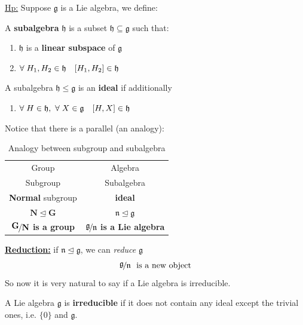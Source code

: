 \documentclass[../main.tex]{subfiles}
\begin{document}
\underline{Hp:} Suppose $\mathfrak{g}$ is a Lie algebra, we define:
\begin{definition} A \textbf{subalgebra} $\mathfrak{h}$ is a subset $\mathfrak{h}\subseteq\mathfrak{g}$ such that:
\renewcommand{\labelenumi}{\Roman{enumi})}
\begin{enumerate}
    \item $\mathfrak{h}$ is a \textbf{linear subspace} of $\mathfrak{g}$
    \item $\forall\;H_1,H_2\in\mathfrak{h}\quad \comm{H_1}{H_2}\in\mathfrak{h}$ 
\end{enumerate}
A subalgebra $\mathfrak{h}\leq\mathfrak{g}$ is an \textbf{ideal} if additionally
\renewcommand{\labelenumi}{III)}
\begin{enumerate}
    \item $\forall\;H\in\mathfrak{h}, \ \forall\;X\in\mathfrak{g}\quad \comm{H}{X}\in\mathfrak{h}$
\end{enumerate}
\end{definition}
Notice that there is a parallel (an analogy):
\begin{table}[H]
    \centering
    \begin{tabular}{c|c}
        Group & Algebra\\
        Subgroup & Subalgebra\\ 
        \textbf{Normal} subgroup & \textbf{ideal}\\
        $\mathbf{N}\trianglelefteq\mathbf{G}$ & $\mathfrak{n}\trianglelefteq\mathfrak{g}$ \\
        \( \nicefrac{\displaystyle\mathbf{G}}{\displaystyle\mathbf{N}}\) \textbf{is a group} & \(\nicefrac{\displaystyle\mathfrak{g}}{\displaystyle\mathfrak{n}}\) \textbf{is a Lie algebra}
        \end{tabular}
    \caption{Analogy between subgroup and subalgebra}
    \label{tab:analogy}
\end{table}
\underline{\textbf{Reduction:}} if $\mathfrak{n}\trianglelefteq\mathfrak{g}$, we can \textit{reduce} $\mathfrak{g}$
\[
\nicefrac{\displaystyle\mathfrak{g}}{\displaystyle\mathfrak{n}}\ \textrm{ is a new object}
\]
So now it is very natural to say if a Lie algebra is irreducible.
\begin{definition}A Lie algebra $\mathfrak{g}$ is \textbf{irreducible} if it does not contain any ideal except the trivial ones, i.e. $\{0\}$ and $\mathfrak{g}$.
\end{definition}
\end{document}
